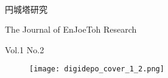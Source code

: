 \documentclass[10pt, a5paper, twoside]{jsarticle}
\theoremstyle{definition}
\begin{document}
	\begin{center}

		~

		\fontsize{43pt}{20mm}\selectfont
		円城塔研究

		\vspace{3mm}

		\LARGE{The Journal of EnJoeToh Research}

		\vspace{3mm}

		\normalsize{Vol.1 No.2}

	\end{center}

	\vspace{10mm}

	\begin{figure}[h]

		\texttt{[image: digidepo\_cover\_1\_2.png]}
		
	\end{figure}{}

	\newpage

	\thispagestyle{empty}
	
	~
	
	\newpage
\end{document}
